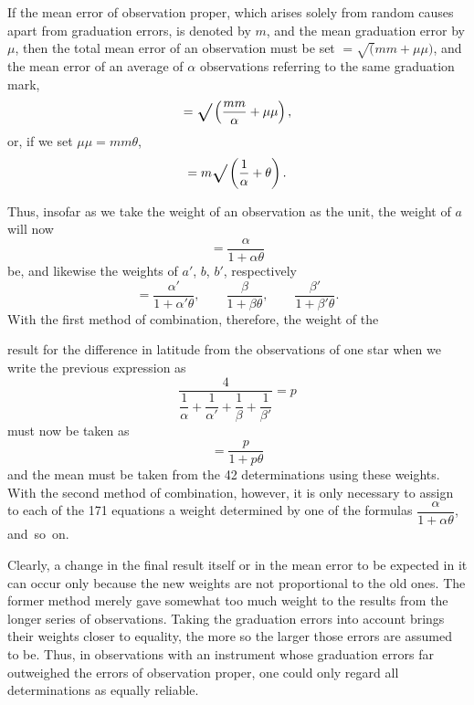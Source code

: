 If the mean error of observation proper, which arises solely from random
causes apart from graduation errors, is denoted by \(m\),
and the mean graduation error by \(\mu\), then the total mean error of an
observation must be set \(=\surd(mm+\mu\mu)\), and the mean error of an
average of \(\alpha\) observations referring to the same graduation mark,
\[
=\ixrad\left(\frac{mm}{\alpha}+\mu\mu\right),
\]
\noindent or, if we set \(\mu\mu=mm\theta\),
\[
=m\ixrad\left(\frac1\alpha+\theta\right).
\]

Thus, insofar as we take the weight of an observation 
as the unit, the weight of \(a\) will now
\[
=\frac{\alpha}{1+\alpha\theta}
\]
\noindent be, and likewise the weights of \(a'\), \(b\), \(b'\), respectively
\[
=\frac{\alpha'}{1+\alpha'\theta},\qquad
\frac{\beta}{1+\beta\theta},\qquad
\frac{\beta'}{1+\beta'\theta}.
\]
With the first method of combination, therefore, the weight of the
\par

\par\clearpage
\noindent\makebox[12mm][l]{}\par\medskip

\noindent result for the difference in latitude from the observations of one star
when we write the previous expression as
\[
\frac4{\dfrac1\alpha+\dfrac1{\alpha'}+\dfrac1\beta+\dfrac1{\beta'}}=p
\]
\noindent must now be taken as
\[
=\frac p{1+p\theta}
\]
\noindent and the mean must be taken from the 42 determinations using these weights.
With the second method of combination, however, it is only necessary
to assign to each of the 171 equations a weight determined
by one of the formulas \(\dfrac{\alpha}{1+\alpha\theta}\), and\ so\ on.

Clearly, a change in the final result itself or in the mean error to be
expected in it can occur only because the new weights are not proportional
to the old ones. The former method merely gave somewhat too much weight
to the results from the longer series of observations. Taking the graduation
errors into account brings their weights closer to equality, the more so the
larger those errors are assumed to be. Thus, in observations with an
instrument whose graduation errors far outweighed
the errors of observation proper, one could only
regard all determinations as equally
reliable.

